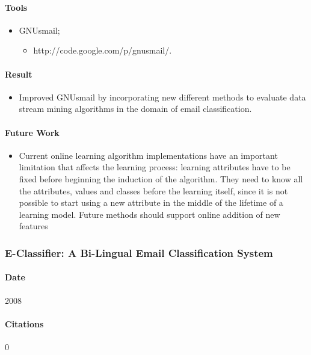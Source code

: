 \documentclass[12pt]{article}
\begin{document}
\paragraph{Tools}
\begin{itemize}
    \item GNUsmail;
    \begin{itemize}
        \item http://code.google.com/p/gnusmail/.
    \end{itemize}
\end{itemize}

\paragraph{Result}
\begin{itemize}
\item Improved GNUsmail by incorporating new different methods to evaluate data stream mining algorithms in the domain of email classification.
\end{itemize}

\paragraph{Future Work}
\begin{itemize}
\item Current online learning algorithm implementations have an important limitation that affects the learning process: learning attributes have to be fixed before beginning the induction of the algorithm. They need to know all the attributes, values and classes before the learning itself, since it is not possible to start using a new attribute in the middle of the lifetime of a learning model. Future methods should support online addition of new features
\end{itemize}


\subsubsection{E-Classifier: A Bi-Lingual Email Classification System}
\paragraph{Date} 2008
\paragraph{Citations} 0
\end{document}
